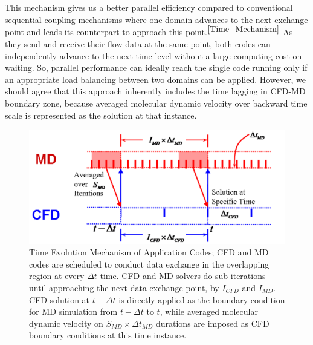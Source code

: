 \documentclass{CFD2010paper}
\begin{document}
This mechanism gives us a better parallel efficiency compared to conventional sequential coupling mechanisms where one domain advances to the next exchange point and leads its counterpart to approach this point.$^{\cite{Time_Mechanism}}$ As they send and receive their flow data at the same point, both codes can independently advance to the next time level without a large computing cost on waiting. So, parallel performance can ideally reach the single code running only if an appropriate load balancing between two domains can be applied. However, we should agree that this approach inherently includes the time lagging in CFD-MD boundary zone, because averaged molecular dynamic velocity over backward time scale is represented as the solution at that instance.

\begin{figure}[ht]
\centering
\includegraphics[width=0.7\linewidth]{Hybrid_Flowchart_1.pdf}
\vskip-0.2cm
\caption{Time Evolution Mechanism of Application Codes; CFD and MD codes are scheduled to conduct data exchange in the overlapping region at every $\Delta{t}$ time. CFD and MD solvers do sub-iterations until approaching the next data exchange point, by $I_{CFD}$ and $I_{MD}$. CFD solution at $t-\Delta{t}$ is directly applied as the boundary condition for MD simulation from $t-\Delta{t}$ to $t$, while averaged molecular dynamic velocity on $S_{MD}\times\Delta{t_{MD}}$ durations are imposed as CFD boundary conditions at this time instance.}
\label{Hybrid_Timescale}
\end{figure}




%
\end{document}
